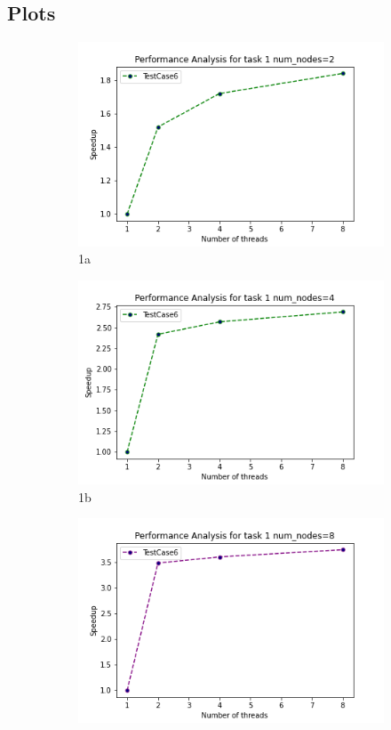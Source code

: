 \documentclass{article}
\begin{document}
\subsection{Plots}

\begin{figure}[H]
\begin{subfigure}{.5\textwidth}
  \centering
  \includegraphics[width=.8\linewidth]{Assignment2/report/1nodes=2.png}
  \caption{1a}
  \label{fig:sfig1}
\end{subfigure}%
\begin{subfigure}{.5\textwidth}
  \centering
  \includegraphics[width=.8\linewidth]{Assignment2/report/1nodes=4.png}
  \caption{1b}
  \label{fig:sfig2}
\end{subfigure}
\begin{subfigure}{.5\textwidth}
  \centering
  \includegraphics[width=.8\linewidth]{Assignment2/report/1nodes=8.png}

\end{subfigure}
\end{figure}
\end{document}
